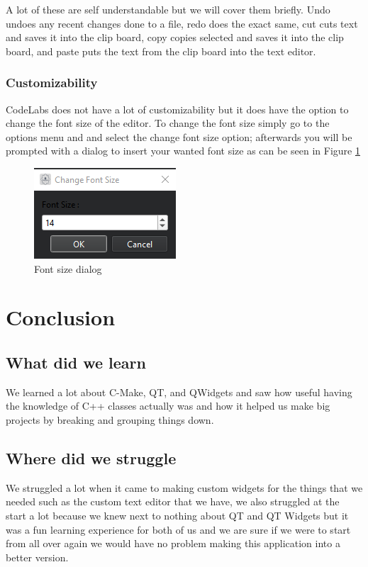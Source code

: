 \documentclass[a4paper, 11pt]{article}
\begin{document}
				\noindent A lot of these are self understandable but we will cover them briefly. Undo undoes any recent changes done to a file, redo does the exact same, cut cuts text and saves it into the clip board, copy copies selected and saves it into the clip board, and paste puts the text from the clip board into the text editor.
				
			\subsubsection{Customizability}
				\noindent CodeLabs does not have a lot of customizability but it does have the option to change the font size of the editor. To change the font size simply go to the options menu and and select the change font size option; afterwards you will be prompted with a dialog to insert your wanted font size as can be seen in Figure \ref{Fig:Font size dialog}
				
				\begin{figure}[h]
					\centering
					\includegraphics[scale = 1.4]{fontSizeDialog}
					\caption{Font size dialog}
					\label{Fig:Font size dialog}
				\end{figure}
				\pagebreak
				
		\section{Conclusion}
			\subsection{What did we learn}
				\noindent We learned a lot about C-Make, QT, and QWidgets and saw how useful having the knowledge of C++ classes actually was and how it helped us make big projects by breaking and grouping things down.
			\subsection{Where did we struggle}
				\noindent We struggled a lot when it came to making custom widgets for the things that we needed such as the custom text editor that we have, we also struggled at the start a lot because we knew next to nothing about QT and QT Widgets but it was a fun learning experience for both of us and we are sure if we were to start from all over again we would have no problem making this application into a better version.
\end{document}
